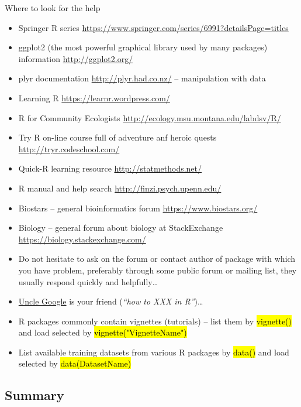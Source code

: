 \documentclass[compress, ucs, xelatex, 11pt, xcolor=svgnames,
  hyperref={
    bookmarks=true,
    unicode=true,
    colorlinks=true,
    pdftitle={Molecular data in R},
    plainpages=false,
    pdfauthor={Vojtech Zeisek},
    pdfsubject={Course about phylogeny and evolution in R},
    pdfcreator={XeLaTeX},
    pdfkeywords={R, evolution, phylogeny, molecular data},
    linkcolor=Tomato,
    anchorcolor=SaddleBrown,
    citecolor=Goldenrod,
    filecolor=DarkMagenta,
    menucolor=Sienna,
    urlcolor=DarkTurquoise,
    pdftex},
  url={hyphens, lowtilde} %
  ]{beamer}
\renewcommand{\texttt}[1]{\hl{\ttfamily #1}}
\begin{document}
\begin{frame}[allowframebreaks]{Where to look for the help}
\begin{itemize}
    \item Springer R series \url{https://www.springer.com/series/6991?detailsPage=titles}
    \item ggplot2 (the most powerful graphical library used by many packages) information \url{http://ggplot2.org/}
    \item plyr documentation \url{http://plyr.had.co.nz/} -- manipulation with data
    \item Learning R \url{https://learnr.wordpress.com/}
    \item R for Community Ecologists \url{http://ecology.msu.montana.edu/labdsv/R/}
    \item Try R on-line course full of adventure anf heroic quests \url{http://tryr.codeschool.com/}
    \item Quick-R learning resource \url{http://statmethods.net/}
    \item R manual and help search \url{http://finzi.psych.upenn.edu/}
    \item Biostars -- general bioinformatics forum \url{https://www.biostars.org/}
    \item Biology -- general forum about biology at StackExchange \url{https://biology.stackexchange.com/}
    \item Do not hesitate to ask on the forum or contact author of package with which you have problem, preferably through some public forum or mailing list, they usually respond quickly and helpfully\ldots
    \item \href{http://rseek.org/}{Uncle Google} is your friend (\textit{``how to XXX in R''})\ldots
    \item R packages commonly contain vignettes (tutorials) -- list them by \texttt{vignette()} and load selected by \texttt{vignette("VignetteName")}
    \item List available training datasets from various R packages by \texttt{data()} and load selected by \texttt{data(DatasetName)}
  \end{itemize}
\end{frame}

\subsection{Summary}
\end{document}
